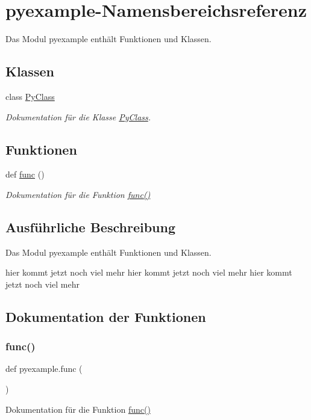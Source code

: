 \hypertarget{namespacepyexample}{}\section{pyexample-\/\+Namensbereichsreferenz}
\label{namespacepyexample}


Das Modul pyexample enthält Funktionen und Klassen.  


\subsection*{Klassen}
\begin{DoxyCompactItemize}
\item 
class \mbox{\hyperlink{classpyexample_1_1_py_class}{Py\+Class}}
\begin{DoxyCompactList}\small\item\em Dokumentation für die Klasse \mbox{\hyperlink{classpyexample_1_1_py_class}{Py\+Class}}. \end{DoxyCompactList}\end{DoxyCompactItemize}
\subsection*{Funktionen}
\begin{DoxyCompactItemize}
\item 
def \mbox{\hyperlink{namespacepyexample_a2daf35288bc9d0a1d4233ab18b553451}{func}} ()
\begin{DoxyCompactList}\small\item\em Dokumentation für die Funktion \mbox{\hyperlink{namespacepyexample_a2daf35288bc9d0a1d4233ab18b553451}{func()}} \end{DoxyCompactList}\end{DoxyCompactItemize}


\subsection{Ausführliche Beschreibung}
Das Modul pyexample enthält Funktionen und Klassen. 

hier kommt jetzt noch viel mehr hier kommt jetzt noch viel mehr hier kommt jetzt noch viel mehr 

\subsection{Dokumentation der Funktionen}
\mbox{\label{namespacepyexample_a2daf35288bc9d0a1d4233ab18b553451}} 
\subsubsection{\texorpdfstring{func()}{func()}}
{\footnotesize\ttfamily def pyexample.\+func (\begin{DoxyParamCaption}{ }\end{DoxyParamCaption})}



Dokumentation für die Funktion \mbox{\hyperlink{namespacepyexample_a2daf35288bc9d0a1d4233ab18b553451}{func()}} 

